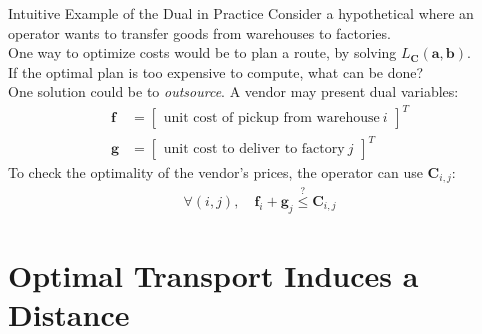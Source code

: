 \documentclass{beamer}
\begin{document}
\begin{frame}{Intuitive Example of the Dual in Practice}
	Consider a hypothetical where an operator wants to transfer goods from warehouses to factories. \pause \newline \\

	One way to optimize costs would be to plan a route, by solving $L_{\bm{C}}(\bm{a}, \bm{b})$. \newline \\

	If the optimal plan is too expensive to compute, what can be done? \pause \newline \\

	One solution could be to \textit{outsource}. A vendor may present dual variables:
	\begin{align}
		\bm{f} &= \begin{bmatrix} \text{unit cost of pickup from warehouse}~i \end{bmatrix}^T \\
		\bm{g} &= \begin{bmatrix} \text{unit cost to deliver to factory}~j \end{bmatrix}^T 
	\end{align} \pause
	To check the optimality of the vendor's prices, the operator can use $\bm{C}_{i,j}$:
	\begin{gather}
		\forall (i,j), \quad \bm{f}_i + \bm{g}_j \stackrel{?}{\leq} \bm{C}_{i,j} 
	\end{gather}
\end{frame}

\section{Optimal Transport Induces a Distance}
\end{document}
